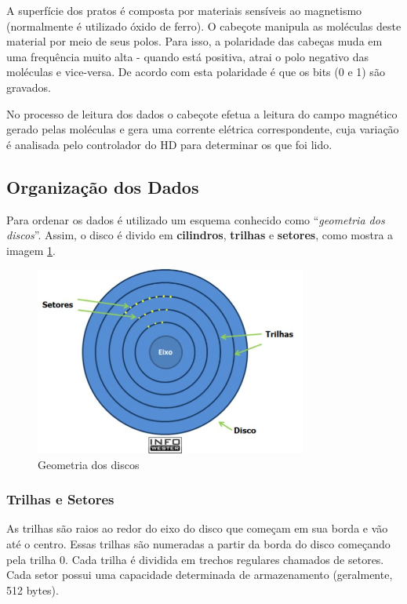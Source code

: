 A superfície dos pratos é composta por materiais sensíveis ao magnetismo (normalmente é utilizado óxido de ferro). O cabeçote manipula as moléculas deste material por meio de seus polos. Para isso, a polaridade das cabeças muda em uma frequência muito alta - quando está positiva, atrai o polo negativo das moléculas e vice-versa. De acordo com esta polaridade é que os bits (0 e 1) são gravados.

No processo de leitura dos dados o cabeçote efetua a leitura do campo magnético gerado pelas moléculas e gera uma corrente elétrica correspondente, cuja variação é analisada pelo controlador do HD para determinar os que foi lido.

\subsection{Organização dos Dados}

Para ordenar os dados é utilizado um esquema conhecido como ``\emph{geometria dos discos}''. Assim, o disco é divido em \textbf{cilindros}, \textbf{trilhas} e \textbf{setores}, como mostra a imagem \ref{fig:disco_divisao}.

\begin{figure}[htb]
\centering
\includegraphics[width=0.8\textwidth]{hd/fig/disco_divisao.png}
\caption{Geometria dos discos}
\label{fig:disco_divisao}
\end{figure}

\subsubsection{Trilhas e Setores}

As trilhas são raios ao redor do eixo do disco que começam em sua borda e vão até o centro. Essas trilhas são numeradas a partir da borda do disco começando pela trilha 0. Cada trilha é dividida em trechos regulares chamados de setores. Cada setor possui uma capacidade determinada de armazenamento (geralmente, 512 bytes).


